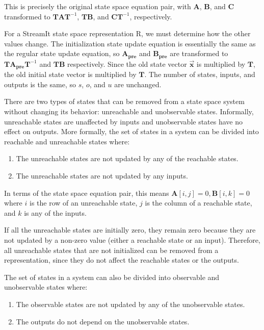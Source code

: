 This is precisely the original state space equation pair,
with $\mathbf{A}$, $\mathbf{B}$, and $\mathbf{C}$ transformed to
$\mathbf{T} \mathbf{A} \mathbf{T}^{-1}$, $\mathbf{T} \mathbf{B}$,
and $\mathbf{C} \mathbf{T}^{-1}$, respectively.

For a StreamIt state space representation $\mathrm{R}$, we must
determine how the other values change. The initialization state update
equation is essentially the same as the regular state update equation,
so $\mathbf{A_{pre}}$ and $\mathbf{B_{pre}}$ are transformed to
$\mathbf{T} \mathbf{A_{pre}} \mathbf{T}^{-1}$ and $\mathbf{T}
\mathbf{B}$ respectively. Since the old state vector
$\vec{\mathbf{x}}$ is multiplied by $\mathbf{T}$, the old initial
state vector is multiplied by $\mathbf{T}$. The number of states,
inputs, and outputs is the same, so $s$, $o$, and $u$ are unchanged.

\label{sec:state-removal}

There are two types of states that can be removed from a state space
system without changing its behavior: unreachable and unobservable
states. Informally, unreachable states are unaffected by inputs and
unobservable states have no effect on outputs. More formally, the set
of states in a system can be divided into reachable and unreachable
states where:
\begin{enumerate}
\vspace{\itemshrink} \item The unreachable states are not updated by any of the
reachable states.

\vspace{\itemshrink} \item The unreachable states are not updated by any inputs.
\vspace{\itemshrink} \end{enumerate}

In terms of the state space equation pair, this means $\mathbf{A}[i,j]
= 0, \mathbf{B}[i,k] = 0$ where $i$ is the row of an unreachable
state, $j$ is the column of a reachable state, and $k$ is any of the
inputs.

If all the unreachable states are initially zero, they remain zero
because they are not updated by a non-zero value (either a reachable
state or an input). Therefore, all unreachable states that are not
initialized can be removed from a representation, since they do not
affect the reachable states or the outputs.

The set of states in a system can also be divided into observable and
unobservable states where:
\begin{enumerate}
\vspace{\itemshrink} \item The observable states are not updated by any of the
unobservable states.

\vspace{\itemshrink} \item The outputs do not depend on the unobservable states.
\vspace{\itemshrink} \end{enumerate}

